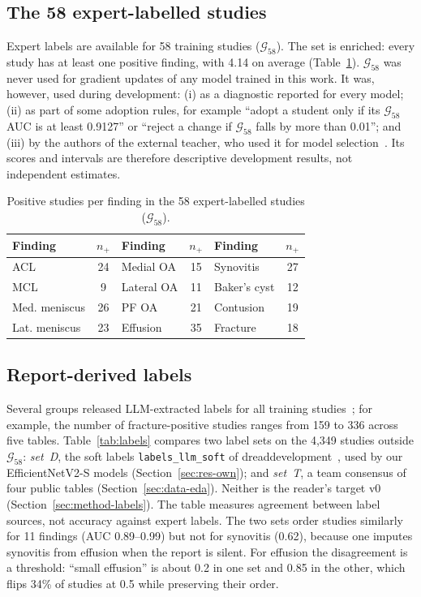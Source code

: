 \documentclass{ieeeaccess}
\newcommand{\gold}{$\mathcal{G}_{58}$}
\begin{document}
\subsection{The 58 expert-labelled studies}
\label{sec:data-gold}
Expert labels are available for 58 training studies (\gold). The set is enriched: every study has at least one positive
finding, with 4.14 on average (Table~\ref{tab:gold}). \gold{} was never used for gradient updates of any model trained in
this work. It was, however, used during development: (i) as a diagnostic reported for every model; (ii) as part of some
adoption rules, for example ``adopt a student only if its \gold{} AUC is at least 0.9127'' or ``reject a change if \gold{}
falls by more than 0.01''; and (iii) by the authors of the external teacher, who used it for model
selection~\cite{nartaa2026mirror}. Its scores and intervals are therefore descriptive development results, not
independent estimates.

\begin{table}[!t]
\centering
\caption{Positive studies per finding in the 58 expert-labelled studies (\gold).}
\label{tab:gold}
\setlength{\tabcolsep}{3pt}
\begin{tabular}{lc@{\hskip 8pt}lc@{\hskip 8pt}lc}
\toprule
Finding & $n_+$ & Finding & $n_+$ & Finding & $n_+$\\
\midrule
ACL & 24 & Medial OA & 15 & Synovitis & 27\\
MCL & 9 & Lateral OA & 11 & Baker's cyst & 12\\
Med. meniscus & 26 & PF OA & 21 & Contusion & 19\\
Lat. meniscus & 23 & Effusion & 35 & Fracture & 18\\
\bottomrule
\end{tabular}
\end{table}

\subsection{Report-derived labels}
Several groups released LLM-extracted labels for all training studies~\cite{labels2026public}; for example, the number
of fracture-positive studies ranges from 159 to 336 across five tables. Table~\ref{tab:labels} compares two label sets on
the 4,349 studies outside \gold: \emph{set~D}, the soft labels \texttt{labels\_llm\_soft} of
dreaddevelopment~\cite{dread2026raptor}, used by our EfficientNetV2-S models (Section~\ref{sec:res-own}); and \emph{set~T}, a
team consensus of four public tables (Section~\ref{sec:data-eda}). Neither is the reader's target v0
(Section~\ref{sec:method-labels}). The table measures agreement between label sources, not accuracy against expert labels. The
two sets order studies similarly for 11 findings (AUC 0.89--0.99) but not for synovitis (0.62), because one imputes
synovitis from effusion when the report is silent. For effusion the disagreement is a threshold: ``small effusion'' is
about 0.2 in one set and 0.85 in the other, which flips 34\% of studies at 0.5 while preserving their order.
\end{document}
